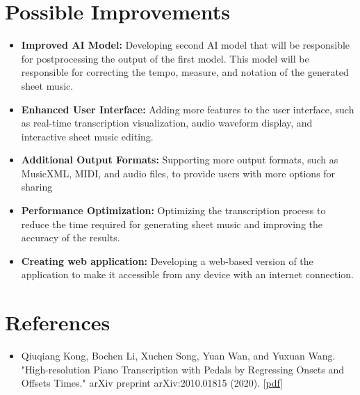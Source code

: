 \documentclass{article}
\begin{document}
\section{Possible Improvements}
\begin{itemize}
    \item \textbf{Improved AI Model:} Developing second AI model that will be responsible for postprocessing the output of the first model. This model will be responsible for correcting the tempo, measure, and notation of the generated sheet music.
    \item \textbf{Enhanced User Interface:} Adding more features to the user interface, such as real-time transcription visualization, audio waveform display, and interactive sheet music editing.
    \item \textbf{Additional Output Formats:} Supporting more output formats, such as MusicXML, MIDI, and audio files, to provide users with more options for sharing
    \item \textbf{Performance Optimization:} Optimizing the transcription process to reduce the time required for generating sheet music and improving the accuracy of the results.
    \item \textbf{Creating web application:} Developing a web-based version of the application to make it accessible from any device with an internet connection.
\end{itemize}

\FloatBarrier
\section{References}
\begin{itemize}
    \item Qiuqiang Kong, Bochen Li, Xuchen Song, Yuan Wan, and Yuxuan Wang. "High-resolution Piano Transcription with Pedals by Regressing Onsets and Offsets Times." arXiv preprint arXiv:2010.01815 (2020). \href{https://arxiv.org/pdf/2010.01815.pdf}{[pdf]}
\end{itemize}
\end{document}
